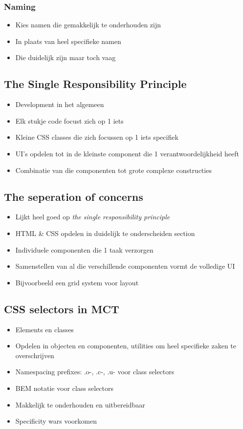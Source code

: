 \documentclass{article}
\begin{document}
\subsubsection{Naming}

\begin{itemize}
    \item Kies namen die gemakkelijk te onderhouden zijn
    \item In plaats van heel specifieke namen
    \item Die duidelijk zijn maar toch vaag
\end{itemize}

\subsection{The Single Responsibility Principle}

\begin{itemize}
    \item Development in het algemeen
    \item Elk stukje code focust zich op 1 iets
    \item Kleine CSS classes die zich focussen op 1 iets specifiek
    \item UI's opdelen tot in de kleinste component die 1 verantwoordelijkheid heeft
    \item Combinatie van die componenten tot grote complexe constructies
\end{itemize}

\subsection{The seperation of concerns}

\begin{itemize}
    \item Lijkt heel goed op \textit{the single responsibility principle}
    \item HTML \& CSS opdelen in duidelijk te onderscheiden section
    \item Individuele componenten die 1 taak verzorgen
    \item Samenstellen van al die verschillende componenten vormt de volledige UI
    \item Bijvoorbeeld een grid system voor layout
\end{itemize}

\subsection{CSS selectors in MCT}
\begin{itemize}
    \item Elements en classes
    \item Opdelen in objecten en componenten, utilities om heel specifieke zaken te overschrijven
    \item Namespacing prefixes: .o-, .c-, .u- voor class selectors
    \item BEM notatie voor class selectors
    \item Makkelijk te onderhouden en uitbereidbaar
    \item Specificity wars voorkomen
\end{itemize}
\end{document}
